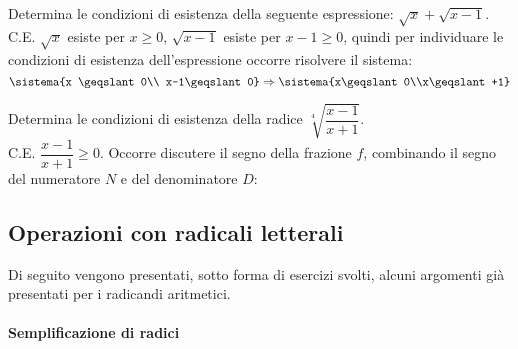 \begin{esempio}{}{}
Determina le condizioni di esistenza della seguente 
espressione: \(\sqrt x+\sqrt{x-1}\).\\

C.E. \(\sqrt x\) esiste per \(x \geqslant 0\), \(\sqrt{x-1}\) 
esiste per \(x-1 \geqslant 0\), quindi per individuare le condizioni di 
esistenza dell'espressione occorre risolvere il sistema: 
\[\sistema{x \geqslant 0\\ x-1\geqslant 0}
  \Rightarrow
  \sistema{x\geqslant 0\\x\geqslant +1}\]

\end{esempio}

\begin{esempio}{}{}
Determina le condizioni di esistenza della radice 
\(\sqrt[4]{\dfrac{x-1}{x+1}}\).\\

C.E. \(\dfrac{x-1}{x+1} \geqslant 0\). 
Occorre discutere il segno della frazione \(f\), combinando il segno del 
numeratore \(N\) e del denominatore \(D\):

\end{esempio}


\subsection{Operazioni con radicali letterali}
\label{subsec:radicali_operazioni_rad_lett}

Di seguito vengono presentati, sotto forma di esercizi svolti, alcuni 
argomenti già presentati per i radicandi aritmetici.

\paragraph{Semplificazione di radici}~

